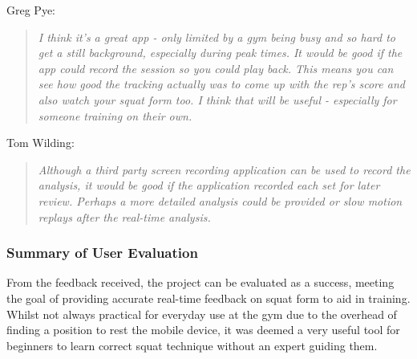 Greg Pye:
\begin{quote}
\emph{I think it's a great app - only limited by a gym being busy and so hard to get a still background, especially during peak times. It would be good if the app could record the session so you could play back. This means you can see how good the tracking actually was to come up with the rep's score and also watch your squat form too. I think that will be useful - especially for someone training on their own.}
\end{quote}

Tom Wilding:
\begin{quote}
\emph{Although a third party screen recording application can be used to record the analysis, it would be good if the application recorded each set for later review. Perhaps a more detailed analysis could be provided or slow motion replays after the real-time analysis.}
\end{quote}

\subsubsection{Summary of User Evaluation}

From the feedback received, the project can be evaluated as a success, meeting the goal of providing accurate real-time feedback on squat form to aid in training. Whilst not always practical for everyday use at the gym due to the overhead of finding a position to rest the mobile device, it was deemed a very useful tool for beginners to learn correct squat technique without an expert guiding them.